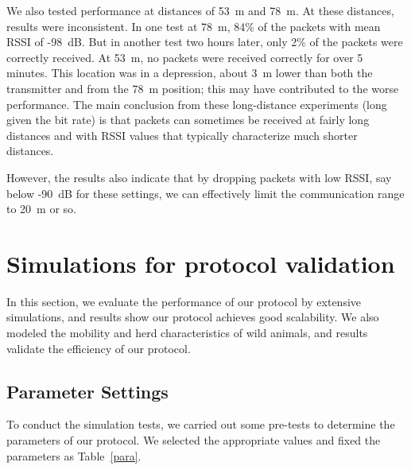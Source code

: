 We also tested performance at distances of 53~m and 78~m. At these distances, results were inconsistent. In one test
at 78~m, 84\% of the packets with mean RSSI of -98~dB. But in another test two hours later, only 2\% of the packets
were correctly received. At 53~m, no packets were received correctly for over 5 minutes. This location was in a depression,
about 3~m lower than both the transmitter and from the 78~m position; this may have contributed to the worse performance.
The main conclusion from these long-distance experiments (long given the bit rate) is that packets can sometimes be received
at fairly long distances and with RSSI values that typically characterize much shorter distances. 

However, the results also indicate that by dropping packets with low RSSI, say below -90~dB for these settings, we can
effectively limit the communication range to 20~m or so.


\section{Simulations for protocol validation}
\label{Simulations}
In this section,  
we evaluate the performance of our protocol by extensive simulations, 
and results show our protocol achieves good scalability. 
We also modeled the mobility and herd characteristics of wild animals,
and results validate the efficiency of our protocol.


\subsection{Parameter Settings}

To conduct the simulation tests, we carried out some pre-tests to determine the 
parameters of our protocol.
We selected the appropriate values and fixed the parameters as Table~\ref{para}.

